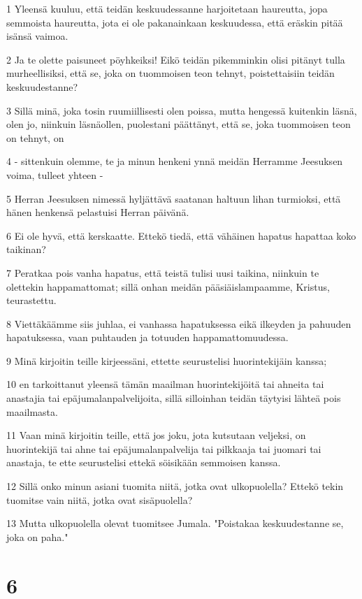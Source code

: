 \par 1 Yleensä kuuluu, että teidän keskuudessanne harjoitetaan haureutta, jopa semmoista haureutta, jota ei ole pakanainkaan keskuudessa, että eräskin pitää isänsä vaimoa.
\par 2 Ja te olette paisuneet pöyhkeiksi! Eikö teidän pikemminkin olisi pitänyt tulla murheellisiksi, että se, joka on tuommoisen teon tehnyt, poistettaisiin teidän keskuudestanne?
\par 3 Sillä minä, joka tosin ruumiillisesti olen poissa, mutta hengessä kuitenkin läsnä, olen jo, niinkuin läsnäollen, puolestani päättänyt, että se, joka tuommoisen teon on tehnyt, on
\par 4 - sittenkuin olemme, te ja minun henkeni ynnä meidän Herramme Jeesuksen voima, tulleet yhteen -
\par 5 Herran Jeesuksen nimessä hyljättävä saatanan haltuun lihan turmioksi, että hänen henkensä pelastuisi Herran päivänä.
\par 6 Ei ole hyvä, että kerskaatte. Ettekö tiedä, että vähäinen hapatus hapattaa koko taikinan?
\par 7 Peratkaa pois vanha hapatus, että teistä tulisi uusi taikina, niinkuin te olettekin happamattomat; sillä onhan meidän pääsiäislampaamme, Kristus, teurastettu.
\par 8 Viettäkäämme siis juhlaa, ei vanhassa hapatuksessa eikä ilkeyden ja pahuuden hapatuksessa, vaan puhtauden ja totuuden happamattomuudessa.
\par 9 Minä kirjoitin teille kirjeessäni, ettette seurustelisi huorintekijäin kanssa;
\par 10 en tarkoittanut yleensä tämän maailman huorintekijöitä tai ahneita tai anastajia tai epäjumalanpalvelijoita, sillä silloinhan teidän täytyisi lähteä pois maailmasta.
\par 11 Vaan minä kirjoitin teille, että jos joku, jota kutsutaan veljeksi, on huorintekijä tai ahne tai epäjumalanpalvelija tai pilkkaaja tai juomari tai anastaja, te ette seurustelisi ettekä söisikään semmoisen kanssa.
\par 12 Sillä onko minun asiani tuomita niitä, jotka ovat ulkopuolella? Ettekö tekin tuomitse vain niitä, jotka ovat sisäpuolella?
\par 13 Mutta ulkopuolella olevat tuomitsee Jumala. "Poistakaa keskuudestanne se, joka on paha."

\chapter{6}

